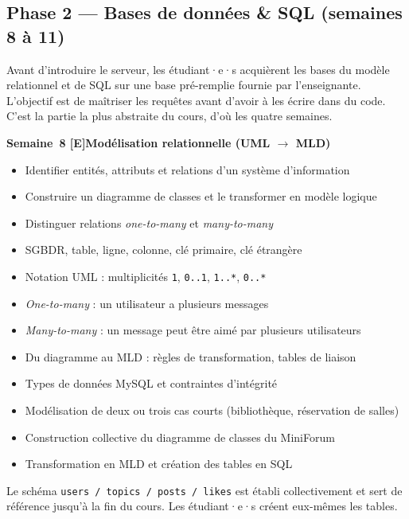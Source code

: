 \documentclass[a4paper,11pt]{article}
\newcommand{\semainetitre}[4]{%
  \needspace{9\baselineskip}%
  \vspace{8pt}
  \noindent
  \begin{tcolorbox}[
    enhanced, colback=cfptBlack, colframe=cfptBlack,
    boxrule=0pt, arc=3pt, boxsep=0pt,
    left=8pt, right=90pt, top=4pt, bottom=4pt,
    overlay={%
      \node[anchor=east, fill=cfptYellow, text=cfptBlack,
            rounded corners=2pt, inner xsep=6pt, inner ysep=3pt,
            font=\scriptsize\bfseries]
        at ([xshift=-6pt]frame.east) {#3};}
  ]
  \color{white}\bfseries\small Semaine~#1 \quad\textcolor{cfptYellow}{[#4]}\quad #2
  \end{tcolorbox}
  \vspace{-4pt}
}
\newcommand{\contenutitre}[1]{%
  \vspace{4pt}
  \noindent{\small\color{accentBlue}\textbf{#1}}\vspace{2pt}
}
\begin{document}
\newpage

\subsection{Phase 2 --- Bases de données \& SQL (semaines 8 à 11)}

\begin{tcolorbox}[intro]
\small Avant d'introduire le serveur, les étudiant·e·s acquièrent les bases du modèle relationnel et de SQL sur une base pré-remplie fournie par l'enseignante. L'objectif est de maîtriser les requêtes avant d'avoir à les écrire dans du code. C'est la partie la plus abstraite du cours, d'où les quatre semaines.
\end{tcolorbox}

\semainetitre{8}{Modélisation relationnelle (UML $\rightarrow$ MLD)}{3h cours / 4h TP}{E}
\begin{tcolorbox}[semaine]
\begin{tcolorbox}[objectifs]
\begin{itemize}
  \item Identifier entités, attributs et relations d'un système d'information
  \item Construire un diagramme de classes et le transformer en modèle logique
  \item Distinguer relations \textit{one-to-many} et \textit{many-to-many}
\end{itemize}
\end{tcolorbox}
\vspace{4pt}
\contenutitre{Cours}
\begin{itemize}
  \item SGBDR, table, ligne, colonne, clé primaire, clé étrangère
  \item Notation UML : multiplicités \texttt{1}, \texttt{0..1}, \texttt{1..*}, \texttt{0..*}
  \item \textit{One-to-many} : un utilisateur a plusieurs messages
  \item \textit{Many-to-many} : un message peut être aimé par plusieurs utilisateurs
  \item Du diagramme au MLD : règles de transformation, tables de liaison
  \item Types de données MySQL et contraintes d'intégrité
\end{itemize}
\contenutitre{Travaux pratiques}
\begin{itemize}
  \item Modélisation de deux ou trois cas courts (bibliothèque, réservation de salles)
  \item Construction collective du diagramme de classes du MiniForum
  \item Transformation en MLD et création des tables en SQL
\end{itemize}
\end{tcolorbox}
\begin{tcolorbox}[filrouge={Schéma officiel du forum}]
\small Le schéma \texttt{users / topics / posts / likes} est établi collectivement et sert de référence jusqu'à la fin du cours. Les étudiant·e·s créent eux-mêmes les tables.
\end{tcolorbox}
\end{document}
